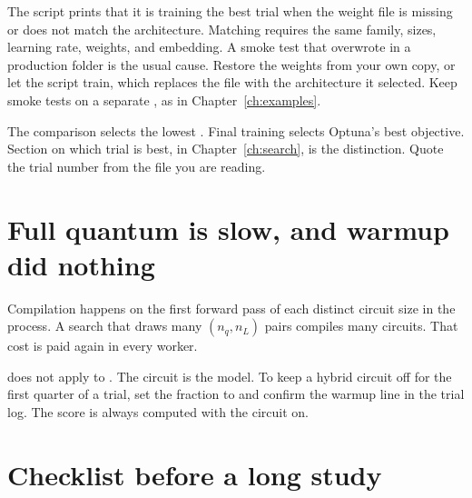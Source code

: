 The script prints that it is training the best trial when the weight file is missing or does not match the architecture.
Matching requires the same family, sizes, learning rate, weights, and embedding.
A smoke test that overwrote  in a production folder is the usual cause.
Restore the weights from your own copy, or let the script train, which replaces the file with the architecture it selected.
Keep smoke tests on a separate , as in Chapter~\ref{ch:examples}.

The comparison selects the lowest .
Final training selects Optuna's best objective.
Section on which trial is best, in Chapter~\ref{ch:search}, is the distinction.
Quote the trial number from the file you are reading.

\section{Full quantum is slow, and warmup did nothing}

Compilation happens on the first forward pass of each distinct circuit size in the process.
A search that draws many \((n_{q}, n_{L})\) pairs compiles many circuits.
That cost is paid again in every worker.

 does not apply to .
The circuit is the model.
To keep a hybrid circuit off for the first quarter of a trial, set the fraction to  and confirm the warmup line in the trial log.
The score is always computed with the circuit on.

\section{Checklist before a long study}

